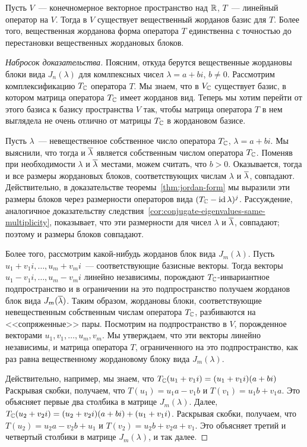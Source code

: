 \begin{theorem}
Пусть $V$~--- конечномерное векторное
пространство над $\mathbb R$, $T$~--- линейный оператор на $V$. Тогда
в $V$ существует вещественный жорданов базис для $T$. Более того,
вещественная жорданова форма оператора $T$ единственна с точностью до
перестановки вещественных жордановых блоков.
\end{theorem}
\begin{proof}[Набросок доказательства]
Поясним, откуда берутся вещественные жордановы блоки вида $J_n(\lambda)$
для комлпексных чисел $\lambda=a+bi$, $b\neq 0$.
Рассмотрим комплексификацию $T_\mathbb C$ оператора $T$. Мы знаем, что
в $V_\mathbb C$ существует базис, в котором матрица оператора $T_\mathbb C$
имеет жорданов вид.
Теперь мы хотим перейти от этого базиса к базису пространства $V$
так, чтобы матрица оператора $T$ в нем выглядела не очень отлично
от матрицы $T_\mathbb C$ в жордановом базисе.

Пусть $\lambda$~--- невещественное собственное число оператора $T_\mathbb C$,
$\lambda=a+bi$. Мы выяснили, что тогда и $\overline\lambda$ является
собственным числом оператора $T_\mathbb C$.
Поменяв при необходимости $\lambda$ и $\overline\lambda$ местами,
можем считать, что $b > 0$.
Оказывается, тогда и все размеры жордановых блоков, соответствующих числам
$\lambda$ и $\overline\lambda$, совпадают. Действительно,
в доказательстве теоремы~\ref{thm:jordan-form} мы выразили эти
размеры блоков через размерности операторов вида
$(T_\mathbb C - \operatorname{id}\lambda)^j$. Рассуждение, аналогичное
доказательству следствия~\ref{cor:conjugate-eigenvalues-same-multiplicity},
показывает, что эти размерности для чисел $\lambda$ и $\overline\lambda$,
совпадают; поэтому и размеры блоков совпадают.

Более того, рассмотрим какой-нибудь жорданов блок вида $J_m(\lambda)$.
Пусть $u_1+v_1i,\dots,u_m+v_mi$~--- соответствующие базисные векторы.
Тогда векторы $u_1 - v_1i,\dots,u_m - v_mi$ линейно независимы,
порождают $T_\mathbb C$-инвариантное подпространство и в ограничении на это
подпространство получаем жорданов блок вида $J_m(\overline\lambda)$.
Таким образом, жордановы блоки, соответствующие невещественным
собственным числам оператора $T_\mathbb C$, разбиваются
на <<сопряженные>> пары.
Посмотрим на подпространство в $V$, порожденное векторами
$u_1,v_1,\dots,u_m,v_m$. Мы утверждаем, что эти векторы линейно
независимы, и матрица оператора $T$, ограниченного на это
подпространство, как раз равна вещественному жордановому блоку
вида $J_m(\lambda)$.

Действительно, например, мы знаем, что $T_\mathbb C(u_1+v_1i) = (u_1+v_1i)(a+bi)$
Раскрывая скобки, получаем, что
$T(u_1)=u_1a-v_1b$ и $T(v_1) = u_1b+v_1a$. Это объясняет
первые два столбика в матрице $J_m(\lambda)$.
Далее, $T_\mathbb C(u_2+v_2i) = (u_2+v_2i)(a+bi) + (u_1+v_1i)$.
Раскрывая скобки, получаем, что
$T(u_2) = u_2a-v_2b+u_1$ и $T(v_2) = u_2b+v_2a+v_1$.
Это объясняет третий и четвертый столбики в матрице $J_m(\lambda)$,
и так далее.


\end{proof}

